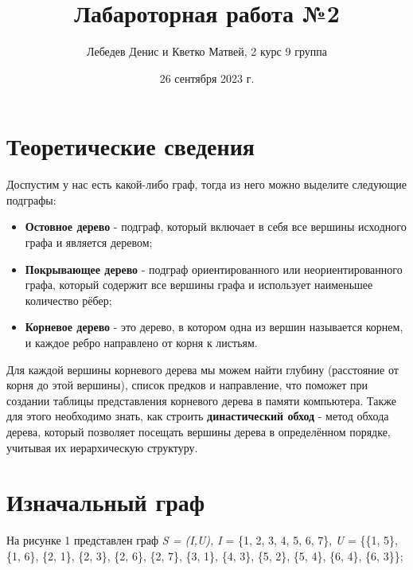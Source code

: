 \documentclass{article}
\title{Лабароторная работа №2}
\author{Лебедев Денис и Кветко Матвей, 2 курс 9 группа}
\date{26 сентября 2023 г.}
\begin{document}
\maketitle
\section{Теоретические сведения}
\hspace*{1cm}Доспустим у нас есть какой-либо граф, тогда из него можно выделите следующие подграфы:
\begin{itemize}
    \item \textbf{Остовное дерево} - подграф, который включает в себя все вершины исходного графа и является деревом;
    \item \textbf{Покрывающее дерево} - подграф ориентированного или неориентированного графа, который содержит все вершины графа и использует наименьшее количество рёбер;
    \item \textbf{Корневое дерево} - это дерево, в котором одна из вершин называется корнем, и каждое ребро направлено от корня к листьям.
\end{itemize}
\hspace*{1cm}Для каждой вершины корневого дерева мы можем найти глубину (расстояние от корня до этой вершины), список предков и направление, что поможет при создании таблицы представления корневого дерева в памяти компьютера. Также для этого необходимо знать, как строить \textbf{династический обход} - метод обхода дерева, который позволяет посещать вершины дерева в определённом порядке, учитывая их иерархическую структуру.

\section{Изначальный граф}
\hspace*{1cm}На рисунке 1 представлен граф \textit{S = (I,U), I} = \{1, 2, 3, 4, 5, 6, 7\}, \textit{U} = \{\{1, 5\}, \{1, 6\}, \{2, 1\}, \{2, 3\}, \{2, 6\}, \{2, 7\}, \{3, 1\}, \{4, 3\}, \{5, 2\}, \{5, 4\}, \{6, 4\}, \{6, 3\}\};
\begin{center}
\end{center}
\end{document}
